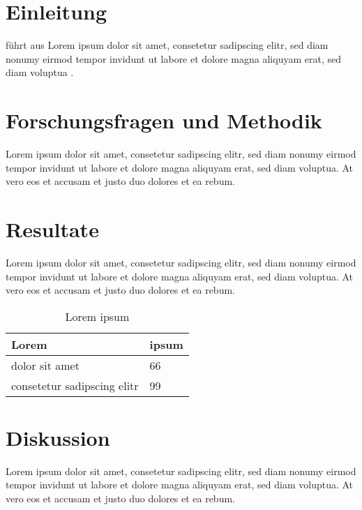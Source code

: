 \documentclass[a4paper,12pt]{scrartcl}
\begin{document}


\section{Einleitung}
\citeauthor{Student2022} führt aus Lorem ipsum dolor sit amet, consetetur sadipscing elitr, sed diam nonumy eirmod tempor invidunt ut labore et dolore magna aliquyam erat, sed diam voluptua \cite{Student2022}. 

\section{Forschungsfragen und Methodik}
Lorem ipsum dolor sit amet, consetetur sadipscing elitr, sed diam nonumy eirmod tempor invidunt ut labore et dolore magna aliquyam erat, sed diam voluptua. At vero eos et accusam et justo duo dolores et ea rebum.

\section{Resultate}
Lorem ipsum dolor sit amet, consetetur sadipscing elitr, sed diam nonumy eirmod tempor invidunt ut labore et dolore magna aliquyam erat, sed diam voluptua. At vero eos et accusam et justo duo dolores et ea rebum.

\begin{table}[ht]
\centering
\begin{tabular}{l l}
Lorem & ipsum \\\hline
dolor sit amet & 66 \\
consetetur sadipscing elitr & 99 \\
\end{tabular}
\caption{Lorem ipsum}
\label{tab:lorem}
\end{table}


\section{Diskussion}
Lorem ipsum dolor sit amet, consetetur sadipscing elitr, sed diam nonumy eirmod tempor invidunt ut labore et dolore magna aliquyam erat, sed diam voluptua. At vero eos et accusam et justo duo dolores et ea rebum.


\end{document}
